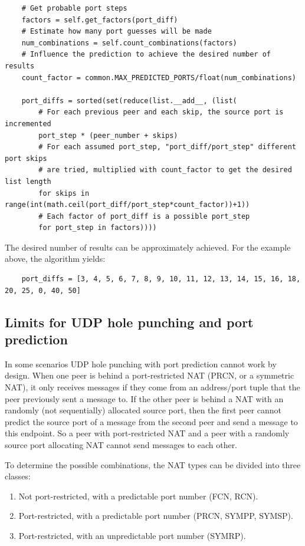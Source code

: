 \documentclass{article}
\begin{document}
\begin{verbatim}
    # Get probable port steps
    factors = self.get_factors(port_diff)
    # Estimate how many port guesses will be made
    num_combinations = self.count_combinations(factors)
    # Influence the prediction to achieve the desired number of results
    count_factor = common.MAX_PREDICTED_PORTS/float(num_combinations)

    port_diffs = sorted(set(reduce(list.__add__, (list(
        # For each previous peer and each skip, the source port is incremented
        port_step * (peer_number + skips)
        # For each assumed port_step, "port_diff/port_step" different port skips
        # are tried, multiplied with count_factor to get the desired list length
        for skips in range(int(math.ceil(port_diff/port_step*count_factor))+1))
        # Each factor of port_diff is a possible port_step
        for port_step in factors))))
\end{verbatim}

The desired number of results can be approximately achieved. For the
example above, the algorithm yields:

\begin{verbatim}
    port_diffs = [3, 4, 5, 6, 7, 8, 9, 10, 11, 12, 13, 14, 15, 16, 18, 20, 25, 0, 40, 50]
\end{verbatim}

\subsection{Limits for UDP hole punching and port prediction}

In some scenarios UDP hole punching with port prediction cannot work
by design.  When one peer is behind a port-restricted NAT (PRCN, or a
symmetric NAT), it only receives messages if they come from an
address/port tuple that the peer previously sent a message to. If the
other peer is behind a NAT with an randomly (not sequentially)
allocated source port, then the first peer cannot predict the source
port of a message from the second peer and send a message to this
endpoint. So a peer with port-restricted NAT and a peer with a
randomly source port allocating NAT cannot send messages to each
other.

To determine the possible combinations, the NAT types can be divided
into three classes:

\begin{enumerate}

\item Not port-restricted, with a predictable port number (FCN, RCN).

\item Port-restricted, with a predictable port number (PRCN, SYMPP,
   SYMSP).

\item Port-restricted, with an unpredictable port number (SYMRP).

\end{enumerate}
\end{document}
